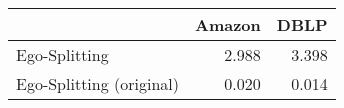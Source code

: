 \begin{tabular}{lrr}
\toprule
{} & Amazon &  DBLP \\
\midrule
Ego-Splitting            &  2.988 & 3.398 \\
Ego-Splitting (original) &  0.020 & 0.014 \\
\bottomrule
\end{tabular}
